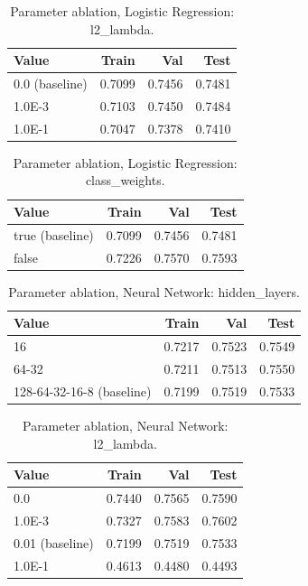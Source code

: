 \begin{table}[ht]
\centering
\small
\caption{Parameter ablation, Logistic Regression: l2\_lambda.}
\label{tab:ablation-logistic-l2-lambda}
\begin{tabular}{lrrr}
\toprule
Value & Train & Val & Test \\
\midrule
0.0 (baseline) & 0.7099 & 0.7456 & 0.7481 \\
1.0E-3 & 0.7103 & 0.7450 & 0.7484 \\
1.0E-1 & 0.7047 & 0.7378 & 0.7410 \\
\bottomrule
\end{tabular}
\end{table}

\begin{table}[ht]
\centering
\small
\caption{Parameter ablation, Logistic Regression: class\_weights.}
\label{tab:ablation-logistic-class-weights}
\begin{tabular}{lrrr}
\toprule
Value & Train & Val & Test \\
\midrule
true (baseline) & 0.7099 & 0.7456 & 0.7481 \\
false & 0.7226 & 0.7570 & 0.7593 \\
\bottomrule
\end{tabular}
\end{table}

\begin{table}[ht]
\centering
\small
\caption{Parameter ablation, Neural Network: hidden\_layers.}
\label{tab:ablation-neural-hidden-layers}
\begin{tabular}{lrrr}
\toprule
Value & Train & Val & Test \\
\midrule
16 & 0.7217 & 0.7523 & 0.7549 \\
64-32 & 0.7211 & 0.7513 & 0.7550 \\
128-64-32-16-8 (baseline) & 0.7199 & 0.7519 & 0.7533 \\
\bottomrule
\end{tabular}
\end{table}

\begin{table}[ht]
\centering
\small
\caption{Parameter ablation, Neural Network: l2\_lambda.}
\label{tab:ablation-neural-l2-lambda}
\begin{tabular}{lrrr}
\toprule
Value & Train & Val & Test \\
\midrule
0.0 & 0.7440 & 0.7565 & 0.7590 \\
1.0E-3 & 0.7327 & 0.7583 & 0.7602 \\
0.01 (baseline) & 0.7199 & 0.7519 & 0.7533 \\
1.0E-1 & 0.4613 & 0.4480 & 0.4493 \\
\bottomrule
\end{tabular}
\end{table}

